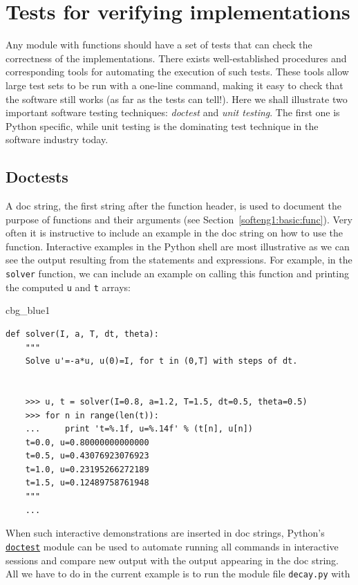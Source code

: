 \documentclass[%
oneside,                 %
final,                   %
10pt]{article}
\newenvironment{_cod_tight}[1]{
   \def\FrameCommand{\colorbox{#1}}
   \FrameRule0.6pt\MakeFramed {\FrameRestore}\vskip3mm}
   {\vskip0mm\endMakeFramed}
\newenvironment{cod}[1]{
\bgroup\rmfamily
\fboxsep=0mm\relax
\begin{_cod_tight}{#1}
\list{}{\parsep=-2mm\parskip=0mm\topsep=0pt\leftmargin=2mm
\rightmargin=2\leftmargin\leftmargin=4pt\relax}
\item\relax}
{\endlist\end{_cod_tight}\egroup}
\begin{document}
\section{Tests for verifying implementations}

Any module with functions should have a set of tests that can
check the
correctness of the implementations.
There exists
well-established procedures and corresponding tools for automating
the execution of such tests. These tools allow large test sets to be
run with a one-line command, making it easy to check that the
software still works (as far as the
tests can tell!). Here we shall illustrate two important
software testing techniques: \emph{doctest} and \emph{unit testing}.
The first one is Python specific, while unit testing is the dominating
test technique in the software industry today.

\subsection{Doctests}


A doc string, the first string after the function header, is used to
document the purpose of functions and their arguments
(see Section~\ref{softeng1:basic:func}). Very often it
is instructive to include an example in the doc string
on how to use the function.
Interactive examples in the Python shell are most illustrative as
we can see the output resulting from the statements and expressions.
For example,
in the \texttt{solver} function, we can include an example on calling
this function and printing the computed \texttt{u} and \texttt{t} arrays:

\begin{cod}{cbg_blue1}\begin{Verbatim}[numbers=none,fontsize=\fontsize{9pt}{9pt},baselinestretch=0.95,xleftmargin=2mm]
def solver(I, a, T, dt, theta):
    """
    Solve u'=-a*u, u(0)=I, for t in (0,T] with steps of dt.


    >>> u, t = solver(I=0.8, a=1.2, T=1.5, dt=0.5, theta=0.5)
    >>> for n in range(len(t)):
    ...     print 't=%.1f, u=%.14f' % (t[n], u[n])
    t=0.0, u=0.80000000000000
    t=0.5, u=0.43076923076923
    t=1.0, u=0.23195266272189
    t=1.5, u=0.12489758761948
    """
    ...
\end{Verbatim}
\end{cod}
\noindent

When such interactive demonstrations are inserted in doc strings,
Python's \href{{http://docs.python.org/library/doctest.html}}{\nolinkurl{doctest}}
module can be used to automate running all commands
in interactive sessions and compare new output with the output
appearing in the doc string.  All we have to do in the current example
is to run the module file \texttt{decay.py} with
\end{document}
